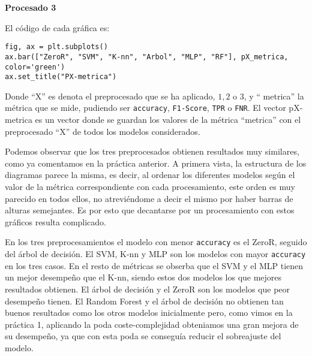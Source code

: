 \documentclass[a4]{article}
\begin{document}
\begin{center}
  \textbf{Procesado 3}
\end{center}

\begin{figure}[H]
  \centering
\end{figure}

\vspace{-5mm}

El código de cada gráfica es:

\begin{lstlisting}
fig, ax = plt.subplots()
ax.bar(["ZeroR", "SVM", "K-nn", "Arbol", "MLP", "RF"], pX_metrica, color='green')
ax.set_title("PX-metrica")
\end{lstlisting}

Donde ``X'' es denota el preprocesado que se ha aplicado, $1, 2$ o $3$, y `` metrica'' la métrica que se mide, pudiendo ser \texttt{accuracy}, \texttt{F1-Score}, \texttt{TPR} o \texttt{FNR}. El vector pX-metrica es un vector donde se guardan los valores de la métrica ``metrica'' con el preprocesado ``X'' de todos los modelos considerados.

Podemos observar que los tres preprocesados obtienen resultados muy similares, como ya comentamos en la práctica anterior. A primera vista, la estructura de los diagramas parece la misma, es decir, al ordenar los diferentes modelos según el valor de la métrica correspondiente con cada procesamiento, este orden es muy parecido en todos ellos, no atreviéndome a decir el mismo por haber barras de alturas semejantes. Es por esto que decantarse por un procesamiento con estos gráficos resulta complicado.

En los tres preprocesamientos el modelo con menor \texttt{accuracy} es el ZeroR, seguido del árbol de decisión. El SVM, K-nn y MLP son los modelos con mayor \texttt{accuracy} en los tres casos. En el resto de métricas se obserba que el SVM y el MLP tienen un mejor desempeño que el K-nn, siendo estos dos modelos los que mejores resultados obtienen. El árbol de decisión y el ZeroR son los modelos que peor desempeño tienen. El Random Forest y el árbol de decisión no obtienen tan buenos resultados como los otros modelos inicialmente pero, como vimos en la práctica 1, aplicando la poda coste-complejidad obteniamos una gran mejora de su desempeño, ya que con esta poda se conseguía reducir el sobreajuste del modelo.
\end{document}
